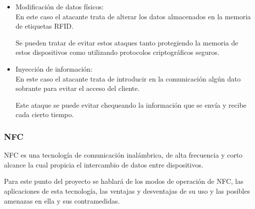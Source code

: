\documentclass[12pt,a4paper,onecolumn,oneside]{report}
\newcounter{subsubsubsection}[subsubsection]
\begin{document}
\begin{itemize}
\item Modificación de datos físicos:\\
En este caso el atacante trata de alterar los datos almacenados en la memoria de etiquetas RFID. 

Se pueden tratar de evitar estos ataques tanto protegiendo la memoria de estos dispositivos como utilizando protocolos criptográficos seguros. 

\item Inyección de información:\\
En este caso el atacante trata de introducir en la comunicación algún dato sobrante para evitar el acceso del cliente. 

Este ataque se puede evitar chequeando la información que se envía y recibe cada cierto tiempo.


\end{itemize}




\subsubsection{NFC}

NFC es una tecnología de comunicación inalámbrica, de alta frecuencia y corto alcance la cual propicia el intercambio de datos entre dispositivos.

Para este punto del proyecto se hablará de los modos de operación de NFC, las aplicaciones de esta tecnología, las ventajas y desventajas de su uso y las posibles amenazas en ella y sus contramedidas.

\end{document}
